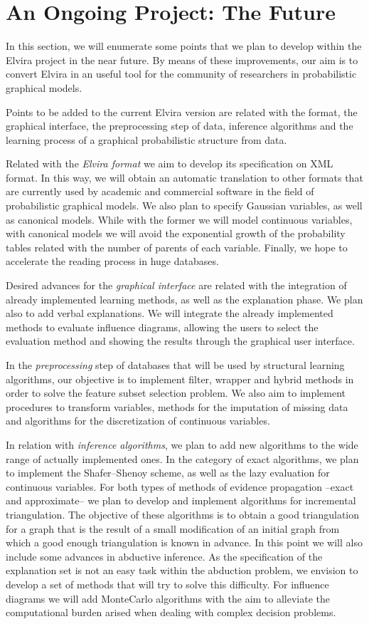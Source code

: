 \section{An Ongoing Project: The Future}
In this section, we will enumerate some points that we plan to
develop within the Elvira project in the near future. By means of these improvements,
 our aim is to convert Elvira in an useful tool for the community of
researchers in probabilistic graphical models.

Points to be added to the current Elvira version are related with
the format, the graphical interface, the preprocessing step of data,
inference algorithms and the learning process of a graphical probabilistic structure
from data.

Related with the {\em Elvira format} we aim to develop its
specification on XML format. In this way, we will obtain an
automatic translation to other formats that are currently used by academic and
commercial software in the field of probabilistic graphical
models. We also plan to specify Gaussian variables, as well as
canonical models. While with the former we will model continuous
variables, with canonical models we will avoid the exponential
growth of the probability tables related with the number of parents
of each variable. Finally, we hope to accelerate the reading process
in huge databases.

Desired advances for the {\em graphical interface} are
related with the integration of already implemented learning methods, as
well as the explanation phase. We plan also to add verbal
explanations. We will integrate the already implemented methods to
evaluate influence diagrams, allowing the users to select the
evaluation method and showing the results through the graphical
user interface.


In the {\em preprocessing} step of databases that will
be used by structural learning algorithms, our objective is to implement
filter, wrapper and hybrid methods in order to solve the feature
subset selection problem. We also aim to implement procedures to
transform variables, methods for the imputation of missing data
and algorithms for the discretization of continuous variables.

In relation with {\em inference algorithms}, we plan to add new
algorithms to the wide range of actually implemented ones.
In the category of exact algorithms, we plan to implement the
Shafer--Shenoy scheme, as well as the lazy evaluation for
continuous variables. For both types of methods of evidence
propagation --exact and approximate-- we plan to develop and
implement algorithms for incremental triangulation. The objective
of these algorithms is to obtain a good triangulation for a graph
that is the result of a small modification of an initial graph from
which a good enough triangulation is known in advance. In this
point we will also include some advances in abductive inference. As
the specification of the  explanation set is not an easy task
within the abduction problem, we envision to develop a set of
methods that will try to solve this difficulty. For influence
diagrams we will add MonteCarlo algorithms with the aim to
alleviate the computational burden arised when dealing with complex
decision problems.

